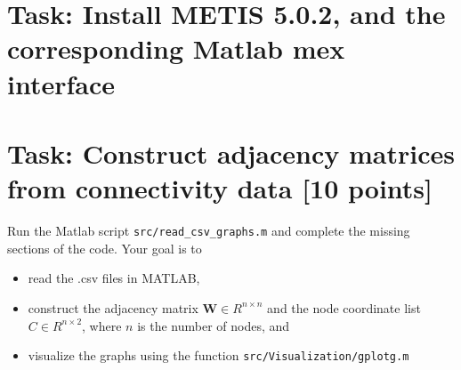 \documentclass[unicode,11pt,a4paper,oneside,numbers=endperiod,openany]{scrartcl}
\begin{document}
\setassignment
{}

\newline

\assignmentpolicy



\section{Task: Install METIS 5.0.2, and the corresponding Matlab mex interface}



\section{Task:  Construct adjacency matrices
from connectivity data [10 points]}


Run the Matlab script
\texttt{src/read\_csv\_graphs.m} and complete
the
missing sections of the code. Your goal is to
\begin{itemize}
    \item read the .csv files in MATLAB,
    \item construct the adjacency matrix
    $\mathbf{W} \in R^{n\times n}$ and
    the node coordinate list $C \in
    R^{n\times 2}$, where $n$ is the number of nodes, and 
    \item visualize the graphs using the
    function
    \texttt{src/Visualization/gplotg.m}
\end{itemize}

\end{document}
